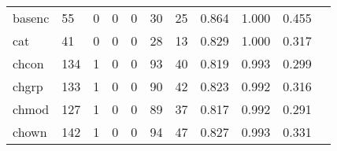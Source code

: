 \begin{longtable}{lp{1.2cm}p{1.2cm}p{1.2cm}p{1.2cm}p{1.2cm}p{1.2cm}p{1.2cm}p{1.2cm}p{1.2cm}p{1.2cm}}
basenc    &                                    55 &                                                  0 &                                                  0 &                                                  0 &                                                 30 &                                                 25 &                                              0.864 &                                              1.000 &                                              0.455 \\
cat       &                                    41 &                                                  0 &                                                  0 &                                                  0 &                                                 28 &                                                 13 &                                              0.829 &                                              1.000 &                                              0.317 \\
chcon     &                                   134 &                                                  1 &                                                  0 &                                                  0 &                                                 93 &                                                 40 &                                              0.819 &                                              0.993 &                                              0.299 \\
chgrp     &                                   133 &                                                  1 &                                                  0 &                                                  0 &                                                 90 &                                                 42 &                                              0.823 &                                              0.992 &                                              0.316 \\
chmod     &                                   127 &                                                  1 &                                                  0 &                                                  0 &                                                 89 &                                                 37 &                                              0.817 &                                              0.992 &                                              0.291 \\
chown     &                                   142 &                                                  1 &                                                  0 &                                                  0 &                                                 94 &                                                 47 &                                              0.827 &                                              0.993 &                                              0.331 \\

\end{longtable}
